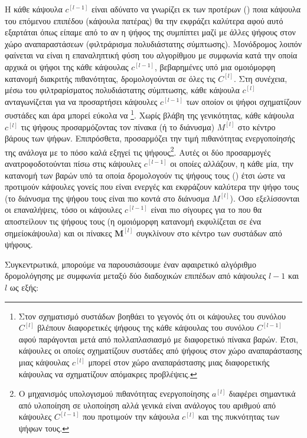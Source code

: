 Η κάθε κάψουλα $c^{[l-1]}$ είναι αδύνατο να γνωρίζει εκ των προτέρων () ποια κάψουλα του επόμενου επιπέδου (κάψουλα πατέρας) θα την εκφράζει καλύτερα αφού αυτό εξαρτάται όπως είπαμε από το αν η ψήφος της συμπίπτει μαζί με άλλες ψήφους στον χώρο αναπαραστάσεων (φιλτράρισμα πολυδιάστατης σύμπτωσης). Μονόδρομος λοιπόν φαίνεται να είναι η επαναληπτική φύση του αλγορίθμου με συμφωνία κατά την οποία αρχικά οι ψήφοι της κάθε κάψουλας $c^{[l-1]}$, βεβαρημένες υπό μια ομοιόμορφη κατανομή διακριτής πιθανότητας, δρομολογούνται σε όλες τις $C^{[l]}$. Στη συνέχεια, μέσω του φιλτραρίσματος πολυδιάστατης σύμπτωσης, κάθε κάψουλα $c^{[l]}$ ανταγωνίζεται για να προσαρτήσει κάψουλες $c^{[l-1]}$ των οποίον οι ψήφοι σχηματίζουν συστάδες και άρα μπορεί εύκολα να \footnote{Στον σχηματισμό συστάδων βοηθάει το γεγονός ότι οι κάψουλες του συνόλου $C^{[l]}$ βλέπουν διαφορετικές  ψήφους της κάθε κάψουλας του συνόλου $C^{[l-1]}$ αφού παράγονται μετά από πολλαπλασιασμό με διαφορετικό πίνακα βαρών. Έτσι, κάψουλες οι οποίες σχηματίζουν συστάδες από ψήφους στον χώρο αναπαράστασης μιας κάψουλας $c^{[l]}$ μπορεί στον χώρο αναπαράστασης μιας διαφορετικής κάψουλας να σχηματίζουν απόμακρες προβλέψεις.}. Χωρίς βλάβη της γενικότητας, κάθε κάψουλα $c^{[l]}$  τις ψήφους προσαρμόζοντας τον πίνακα (ή το διάνυσμα) $M^{[l]}$ στο κέντρο βάρους των ψήφων. Επιπρόσθετα, προσαρμόζει την τιμή πιθανότητας ενεργοποίησής της ανάλογα με το πόσο καλά εξηγεί τις ψήφους\footnote{Ο μηχανισμός υπολογισμού πιθανότητας ενεργοποίησης $a^{[l]}$ διαφέρει σημαντικά από υλοποίηση σε υλοποίηση αλλά γενικά είναι ανάλογος του αριθμού από κάψουλες $C^{[l-1]}$ που προτιμούν την κάψουλα $c^{[l]}$ και της πυκνότητας των ψήφων τους.}. Αυτές οι δύο προσαρμογές ανατροφοδοτούνται πίσω στις κάψουλες $c^{[l-1]}$ οι οποίες αλλάζουν, η κάθε μία, την κατανομή των βαρών υπό τα οποία δρομολογούν τις ψήφους τους () έτσι ώστε να προτιμούν κάψουλες γονείς που είναι ενεργές και εκφράζουν καλύτερα την ψήφο τους (το διάνυσμα της ψήφου τους είναι πιο κοντά στο διάνυσμα $M^{[l]}$). Όσο εξελίσσονται οι επαναλήψεις, τόσο οι κάψουλες $c^{[l-1]}$ είναι πιο σίγουρες για το που θα αποστείλουν τις ψήφους τους (η ομοιόμορφη κατανομή εκφυλίζεται σε ένα σημείο\textendash κάψουλα) και οι πίνακες $\boldsymbol{M}^{[l]}$ συγκλίνουν στο κέντρο των συστάδων από ψήφους.\par

Συγκεντρωτικά, μπορούμε να παρουσιάσουμε έναν αφαιρετικό αλγόριθμο δρομολόγησης με συμφωνία μεταξύ δύο διαδοχικών επιπέδων από κάψουλες $l-1$ και $l$ ως εξής:

